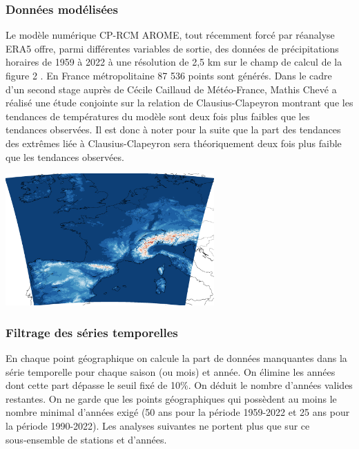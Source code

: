 \documentclass[
  article,
  nofooter,
  noheadings]{jss}
\begin{document}

\subsubsection{Données modélisées}\label{donnuxe9es-moduxe9lisuxe9es}

Le modèle numérique CP-RCM AROME, tout récemment forcé par réanalyse
ERA5 offre, parmi différentes variables de sortie, des données de
précipitations horaires de 1959 à 2022 à une résolution de 2,5 km sur le
champ de calcul de la figure 2 \citep{arome2014}. En France
métropolitaine 87 536 points sont générés. Dans le cadre d'un second
stage auprès de Cécile Caillaud de Météo-France, Mathis Chevé a réalisé
une étude conjointe sur la relation de Clausius-Clapeyron montrant que
les tendances de températures du modèle sont deux fois plus faibles que
les tendances observées. Il est donc à noter pour la suite que la part
des tendances des extrêmes liée à Clausius-Clapeyron sera théoriquement
deux fois plus faible que les tendances observées.\\

\begin{center}
  \includegraphics[width=0.6\textwidth]{figures/domaine_calcul_AROME.png}
\end{center}


\subsubsection{Filtrage des séries
temporelles}\label{filtrage-des-suxe9ries-temporelles}

En chaque point géographique on calcule la part de données manquantes
dans la série temporelle pour chaque saison (ou mois) et année. On
élimine les années dont cette part dépasse le seuil fixé de 10\%. On
déduit le nombre d'années valides restantes. On ne garde que les points
géographiques qui possèdent au moins le nombre minimal d'années exigé
(50 ans pour la période 1959-2022 et 25 ans pour la période 1990-2022).
Les analyses suivantes ne portent plus que sur ce sous‑ensemble de
stations et d'années.
\end{document}
